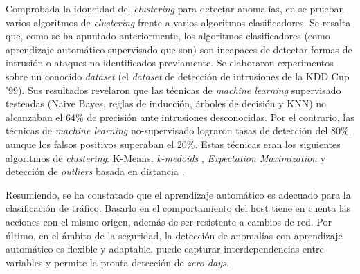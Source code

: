 Comprobada la idoneidad del \emph{clustering} para detectar anomalías, en \cite{Syarif_2012} se prueban varios algoritmos de \emph{clustering} frente a varios algoritmos clasificadores.
Se resalta que, como se ha apuntado anteriormente, los algoritmos clasificadores (como aprendizaje automático supervisado que son) son incapaces de detectar formas de intrusión o ataques no identificados previamente.
Se elaboraron experimentos sobre un conocido \emph{dataset} (el \emph{dataset} de detección de intrusiones de la KDD Cup '99).
Sus resultados revelaron que las técnicas de \emph{machine learning} supervisado testeadas (Naive Bayes, reglas de inducción, árboles de decisión y KNN) no alcanzaban el 64\% de precisión ante intrusiones desconocidas.
Por el contrario, las técnicas de \emph{machine learning} no-supervisado lograron tasas de detección del 80\%, aunque los falsos positivos superaban el 20\%.
Estas técnicas eran los siguientes algoritmos de \emph{clustering}: K-Means, \emph{k-medoids} \cite{Velmurugan_2010}, \emph{Expectation Maximization} \cite{Lu_2009} y detección de \emph{outliers} basada en distancia \cite{Orair_2010}.

Resumiendo, se ha constatado que el aprendizaje automático es adecuado para la clasificación de tráfico.
Basarlo en el comportamiento del host tiene en cuenta las acciones con el mismo origen, además de ser resistente a cambios de red.
Por último, en el ámbito de la seguridad, la detección de anomalías con aprendizaje automático es flexible y adaptable, puede capturar interdependencias entre variables y permite la pronta detección de \emph{zero-days}.
